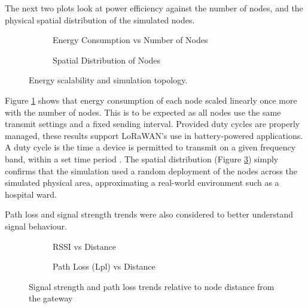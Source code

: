 \vspace{1em} \noindent The next two plots look at power efficiency against the number of nodes, and the physical spatial distribution of the simulated nodes.

\begin{figure}[H]
\centering
\begin{subfigure}{0.48\textwidth}
	\centering
	
	\caption{Energy Consumption vs Number of Nodes}
	\label{fig:energy_vs_nodes}
\end{subfigure}
\hfill
\begin{subfigure}{0.48\textwidth}
	\centering
	
	\caption{Spatial Distribution of Nodes}
	\label{fig:spatial_distribution}
\end{subfigure}
\caption{Energy scalability and simulation topology.}
\end{figure}

Figure \ref{fig:energy_vs_nodes} shows that energy consumption of each node scaled linearly once more with the number of nodes. This is to be expected as all nodes use the same transmit settings and a fixed sending interval. Provided duty cycles are properly managed, these results support LoRaWAN's use in battery-powered applications. A duty cycle is the time a device is permitted to transmit on a given frequency band, within a set time period \cite{duty_cycles}. The spatial distribution (Figure \ref{fig:spatial_distribution}) simply confirms that the simulation used a random deployment of the nodes across the simulated physical area, approximating a real-world environment such as a hospital ward.

\vspace{1em} \noindent Path loss and signal strength trends were also considered to better understand signal behaviour.
\begin{figure}[H]
\centering
\begin{subfigure}{0.48\textwidth}
	\centering
	
	\caption{RSSI vs Distance}
	\label{fig:rssi_vs_distance}
\end{subfigure}
\hfill
\begin{subfigure}{0.48\textwidth}
	\centering
	
	\caption{Path Loss (Lpl) vs Distance}
	\label{fig:lpl_vs_distance}
\end{subfigure}
\caption{Signal strength and path loss trends relative to node distance from the gateway}
\end{figure}

